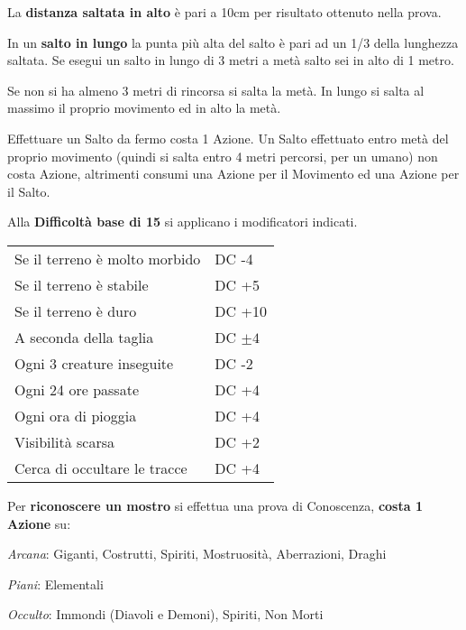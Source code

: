\documentclass[landscape,10pt,a4paper]{article}
\begin{document}
\begin{multicols}{3}
\begin{dmbox}[title=Atletica - pagina \pageref{atletica}]
La \textbf{distanza saltata in alto} è pari a 10cm per risultato ottenuto nella prova.

In un \textbf{salto in lungo} la punta più alta del salto è pari ad un 1/3 della lunghezza saltata. Se esegui un salto in lungo di 3 metri a metà salto sei in alto di 1 metro.

Se non si ha almeno 3 metri di rincorsa si salta la metà. In lungo si salta al massimo il proprio movimento ed in alto la metà.

Effettuare un Salto da fermo costa 1 Azione. Un Salto effettuato entro metà del proprio movimento (quindi si salta entro 4 metri percorsi, per un umano) non costa Azione, altrimenti consumi una Azione per il Movimento ed una Azione per il Salto.
\end{dmbox}



\begin{dmbox}[title=Seguire Tracce - pagina \pageref{seguiretracce}]
	Alla \textbf{Difficoltà base di 15} si applicano i modificatori indicati.\\
	
	\noindent\begin{tabular}{ll}
		Se il terreno è molto morbido& DC -4\\
		Se il terreno è stabile& DC +5\\
		Se il terreno è duro& DC +10\\
		A seconda della taglia& DC $\pm4$\\
		Ogni 3 creature inseguite& DC -2\\
		Ogni 24 ore passate& DC +4\\
		Ogni ora di pioggia& DC +4\\
		Visibilità scarsa& DC +2\\
		Cerca di occultare le tracce& DC +4\\
	\end{tabular}
\end{dmbox}

\begin{dmbox}[title=Riconoscere i mostri - pagina \pageref{riconosceremostro}]

Per \textbf{riconoscere un mostro} si effettua una prova di Conoscenza, \textbf{costa 1 Azione} su:

\medskip

\emph{Arcana}: Giganti, Costrutti, Spiriti, Mostruosità, Aberrazioni, Draghi

\emph{Piani}: Elementali

\emph{Occulto}: Immondi (Diavoli e Demoni), Spiriti, Non Morti


\end{dmbox}
\end{multicols}
\end{document}
